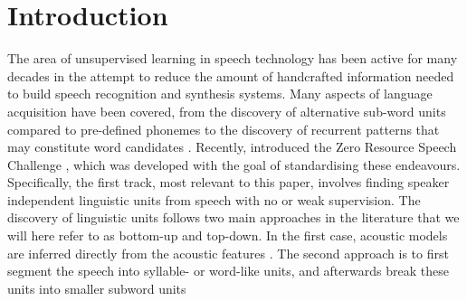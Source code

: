 \section{Introduction}
\label{sec:introduction}
The area of unsupervised learning in speech technology has been active for many decades in the attempt to reduce the amount of handcrafted information needed to build speech recognition and synthesis systems.
Many aspects of language acquisition have been covered, from the discovery of alternative sub-word units compared to pre-defined phonemes \parencite{LeeEtAl1988,SvendsenEtAl1989,BacchianiEtAl1996,Huijbregts, OGrady:2008up} to the discovery of recurrent patterns that may constitute word candidates \cite{Rasanen2011149, ParkAndGlass2008, Aimetti2010, StoutenEtAl2008phonepatterns, DriesenEtAl2009adaptivenon-negative, gs:VanhainenAndSalvi2012Interspeech, gs:VanhainenAndSalvi2014ICASSP}.
Recently, \citeauthor{versteegh2015zero} introduced the Zero Resource Speech Challenge \parencite{versteegh2015zero}, which was developed with the goal of standardising these endeavours.
Specifically, the first track, most relevant to this paper, involves finding speaker independent linguistic units from speech with no or weak supervision.
The discovery of linguistic units follows two main approaches in the literature that we will here refer to as bottom-up and top-down. 
In the first case, acoustic models are inferred directly from the acoustic features \parencite{varadarajan2008unsupervised, lee2012nonparametric, siu2014unsupervised, chen2015parallel, zhang2010towards, versteegh2016zero, heck2016unsupervised, synnaeve2016temporal}.
The second approach is to first segment the speech into syllable- or word-like units, and afterwards break these units into smaller subword units \parencite{jansen2013weak, park2008unsupervised, jansen2011efficient, versteegh2015zero, jansen2011towards, jansen2013weak, synnaeve2014phonetics, thiolliere2015hybrid, versteegh2016zero, zeghidour2016deep, kamper2015unsupervised, renshaw2015comparison}

